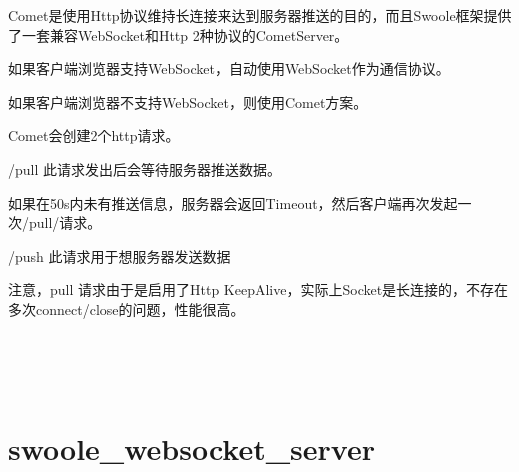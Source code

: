 Comet是使用Http协议维持长连接来达到服务器推送的目的，而且Swoole框架提供了一套兼容WebSocket和Http 2种协议的CometServer。


\begin{compactitem}
\item 如果客户端浏览器支持WebSocket，自动使用WebSocket作为通信协议。

\item 如果客户端浏览器不支持WebSocket，则使用Comet方案。
\end{compactitem}


Comet会创建2个http请求。

\begin{compactitem}
\item /pull 此请求发出后会等待服务器推送数据。

如果在50s内未有推送信息，服务器会返回Timeout，然后客户端再次发起一次/pull/请求。
\item /push 此请求用于想服务器发送数据
\end{compactitem}

注意，pull 请求由于是启用了Http KeepAlive，实际上Socket是长连接的，不存在多次connect/close的问题，性能很高。

\begin{lstlisting}[language=PHP]

\end{lstlisting}



\begin{lstlisting}[language=PHP]

\end{lstlisting}



\begin{lstlisting}[language=PHP]

\end{lstlisting}




\begin{lstlisting}[language=PHP]

\end{lstlisting}




\begin{lstlisting}[language=PHP]

\end{lstlisting}






\chapter{swoole\_websocket\_server}


